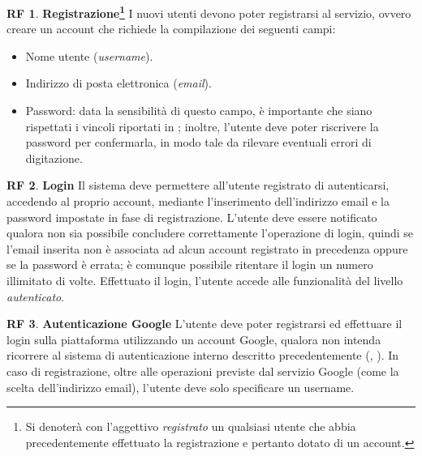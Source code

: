 \documentclass[11pt, a4paper]{article}
\theoremstyle{definition}
\newtheorem{funcreq}{RF} %
\begin{document}
\begin{funcreq}
\label{signup}
\textbf{Registrazione\footnote{Si denoterà con l'aggettivo \textit{registrato} un qualsiasi
utente che abbia precedentemente effettuato la registrazione e pertanto dotato di un account.} }
I nuovi utenti devono poter registrarsi al servizio, ovvero creare un account che
richiede la compilazione dei seguenti campi:
\begin{itemize}
    \item Nome utente (\textit{username}).
    \item Indirizzo di posta elettronica (\textit{email}).
    \item Password: data la sensibilità di questo campo, è importante
    che siano rispettati i vincoli riportati in \textcolor{blue}{};
    inoltre, l'utente deve poter riscrivere la password per confermarla, in
    modo tale da rilevare eventuali errori di digitazione.
\end{itemize}
\end{funcreq}

\begin{funcreq}
\label{login}
\textbf{Login }
Il sistema deve permettere all'utente registrato di autenticarsi,
accedendo al proprio account, mediante l'inserimento dell'indirizzo
email e la password impostate in fase di registrazione. L'utente deve
essere notificato qualora non sia possibile concludere correttamente
l'operazione di login, quindi se l'email inserita non è associata ad alcun
account registrato in precedenza oppure se la password è errata;
è comunque possibile ritentare il login un numero illimitato di volte.
Effettuato il login, l'utente accede alle funzionalità del livello \textit{autenticato}.
\end{funcreq}

\begin{funcreq}
\label{google}
\textbf{Autenticazione Google }
L'utente deve poter registrarsi ed effettuare il login sulla piattaforma
utilizzando un account Google, qualora non intenda ricorrere al sistema di
autenticazione interno descritto precedentemente (\textcolor{blue}{}, \textcolor{blue}{}).
In caso di registrazione, oltre alle operazioni previste dal servizio Google
(come la scelta dell'indirizzo email), l'utente deve solo specificare un username.
\end{funcreq}
\end{document}
